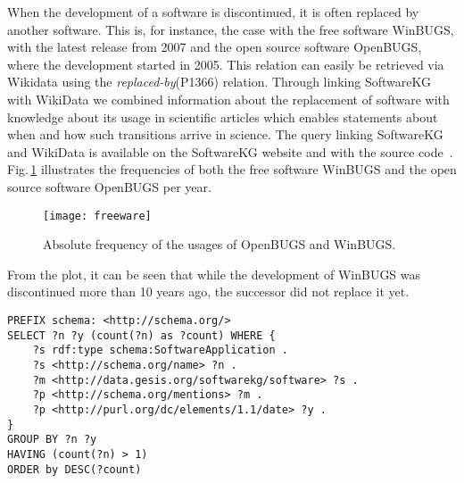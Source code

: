 \documentclass[runningheads]{llncs}
\newcommand{\figref}[1]{Fig.\,\ref{#1}}
\begin{document}
When the development of a software is discontinued, it is often replaced by another software.
This is, for instance, the case with the free software WinBUGS, with the latest release from 2007 and the open source software OpenBUGS, where the development started in 2005.
This relation can easily be retrieved via Wikidata using the \textit{replaced-by}(P1366) relation.
Through linking SoftwareKG with WikiData we combined information about the replacement of software with knowledge about its usage in scientific articles which enables statements about when and how such transitions arrive in science. 
The query linking SoftwareKG and WikiData is available on the SoftwareKG website and with the source code~\cite{Schindler_softwarekg_2020}.
\figref{fig:BUGS} illustrates the frequencies of both the free software WinBUGS and the open source software OpenBUGS per year.
\begin{figure}[tb]
    \centering
    \texttt{[image: freeware]}
    \caption{Absolute frequency of the usages of OpenBUGS and WinBUGS.}
    \label{fig:BUGS}
\end{figure}
From the plot, it can be seen that while the development of WinBUGS was discontinued more than 10 years ago, the successor did not replace it yet.

\begin{lstlisting}[float,captionpos=b, caption={SPARQL query to retrieve frequency of software mention per year}, label={lst:sparql}, basicstyle=\ttfamily,frame=single]
PREFIX schema: <http://schema.org/>
SELECT ?n ?y (count(?n) as ?count) WHERE {
    ?s rdf:type schema:SoftwareApplication .
    ?s <http://schema.org/name> ?n .
    ?m <http://data.gesis.org/softwarekg/software> ?s .
    ?p <http://schema.org/mentions> ?m .
    ?p <http://purl.org/dc/elements/1.1/date> ?y .
}
GROUP BY ?n ?y
HAVING (count(?n) > 1)
ORDER by DESC(?count)
\end{lstlisting}
\end{document}
